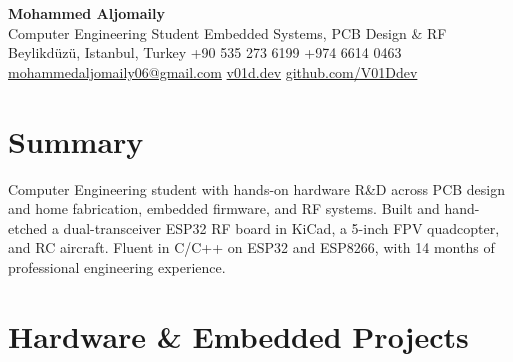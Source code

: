 \documentclass[10pt,a4paper]{article}
\begin{document}
\begin{center}
    {\LARGE \textbf{Mohammed Aljomaily}}\\[5pt]
    Computer Engineering Student \textbar{} Embedded Systems, PCB Design \& RF\\[5pt]
    Beylikd\"uz\"u, Istanbul, Turkey \textbar{} +90 535 273 6199 \textbar{} +974 6614 0463\\[3pt]
    \href{mailto:mohammedaljomaily06@gmail.com}{mohammedaljomaily06@gmail.com} \textbar{} \href{https://v01d.dev}{v01d.dev} \textbar{} \href{https://github.com/V01Ddev}{github.com/V01Ddev}
\end{center}

\section*{Summary}
Computer Engineering student with hands-on hardware R\&D across PCB design and
home fabrication, embedded firmware, and RF systems. Built and hand-etched a
dual-transceiver ESP32 RF board in KiCad, a 5-inch FPV quadcopter, and RC
aircraft. Fluent in C/C++ on ESP32 and ESP8266, with 14 months of professional
engineering experience.

\section*{Hardware \& Embedded Projects}
\end{document}
